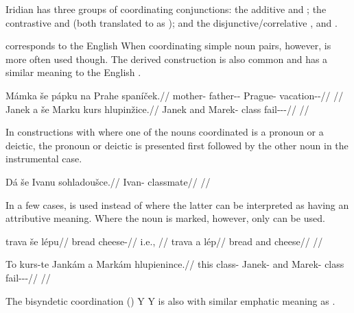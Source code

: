 Iridian has three groups of coordinating conjunctions: the additive
 and ; the contrastive  and  (both
translated to  as ); and the
disjunctive/correlative ,  and .

 corresponds to the English  When coordinating simple noun
pairs, however,  is more often used though. The derived construction
 is also common and has a similar meaning to the English .

\pex
\begingl
    \gla Mámka {še} pápku na Prahe spaníček.//
    \glb mother-\Dim{} \Com{} father-\Dim{}-\Ins{} \Loc{} Prague-\Acc{} vacation-\Av{}-\Pf{}//
    \glft {}//
\endgl
\xe
\pex
\begingl
    \gla Janek {a} {še} Marku kurs hlupinžice.//
    \glb Janek and \Com{} Marek-\Ins{} class fail-\Av{}-\Pf{}-\Quot{}//
    \glft {}//
\endgl
\xe

In constructions with  where one of the nouns coordinated is a pronoun
or a deictic, the pronoun or deictic is presented first followed
by the other noun in the instrumental case.

\pex
\begingl
    \gla Dá {še} Ivanu sohladoušce.// \glb {} \Com{} Ivan-\Ins{}
    classmate// \glft {}//
\endgl
\xe

In a few cases,  is used instead of  where the latter can be
interpreted as having an attributive meaning. Where the noun is marked, however,
only  can be used.

\begin{multicols}{2}
\pex\a
\begingl
    \gla trava {še} lépu//
    \glb bread \Com{} cheese-\Ins{}//
    \glft {} i.e., //
\endgl
\a
\begingl
    \gla trava {a} lép//
    \glb bread and cheese//
    \glft {}//
\endgl
\xe\end{multicols}

\pex
\begingl
    \gla To kurs-te Jankám {a} Markám hlupienince.//
    \glb this class-\Foc{} Janek-\Agt{} and Marek-\Agt{} class fail-\Pv{}-\Pf{}-\Quot{}//
    \glft {}//
\endgl
\xe


The bisyndetic coordination (\cite{velupillai2012})  Y  Y is also
with similar emphatic meaning as .

